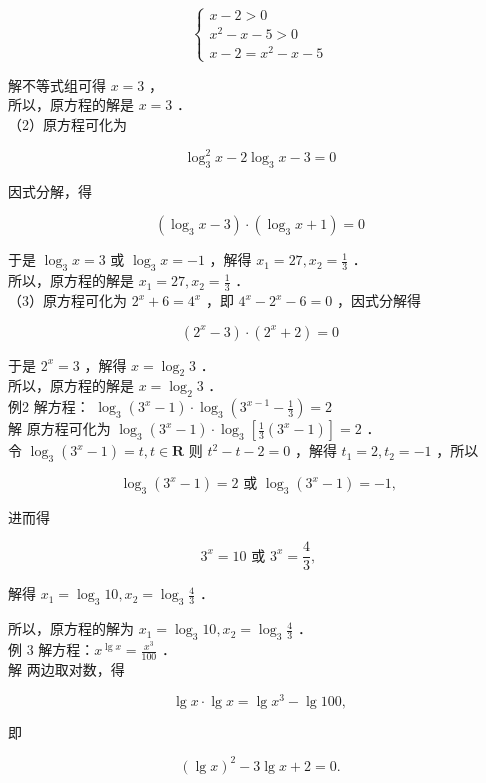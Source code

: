 \documentclass[10pt]{article}
\begin{document}
\[
\left\{\begin{array}{l}
x-2>0 \\
x^{2}-x-5>0 \\
x-2=x^{2}-x-5
\end{array}\right.
\]

解不等式组可得 \(x=3\) ，\\
所以，原方程的解是 \(x=3\) ．\\
（2）原方程可化为

\[
\log _{3}^{2} x-2 \log _{3} x-3=0
\]

因式分解，得

\[
\left(\log _{3} x-3\right) \cdot\left(\log _{3} x+1\right)=0
\]

于是 \(\log _{3} x=3\) 或 \(\log _{3} x=-1\) ，解得 \(x_{1}=27, x_{2}=\frac{1}{3}\) ．\\
所以，原方程的解是 \(x_{1}=27, x_{2}=\frac{1}{3}\) ．\\
（3）原方程可化为 \(2^{x}+6=4^{x}\) ，即 \(4^{x}-2^{x}-6=0\) ，因式分解得

\[
\left(2^{x}-3\right) \cdot\left(2^{x}+2\right)=0
\]

于是 \(2^{x}=3\) ，解得 \(x=\log _{2} 3\) ．\\
所以，原方程的解是 \(x=\log _{2} 3\) ．\\
例2 解方程： \(\log _{3}\left(3^{x}-1\right) \cdot \log _{3}\left(3^{x-1}-\frac{1}{3}\right)=2\)\\
解 原方程可化为 \(\log _{3}\left(3^{x}-1\right) \cdot \log _{3}\left[\frac{1}{3}\left(3^{x}-1\right)\right]=2\) ．\\
令 \(\log _{3}\left(3^{x}-1\right)=t, t \in \mathbf{R}\) 则 \(t^{2}-t-2=0\) ，解得 \(t_{1}=2, t_{2}=-1\) ，所以

\[
\log _{3}\left(3^{x}-1\right)=2 \text { 或 } \log _{3}\left(3^{x}-1\right)=-1 \text {, }
\]

进而得

\[
3^{x}=10 \text { 或 } 3^{x}=\frac{4}{3} \text {, }
\]

解得 \(x_{1}=\log _{3} 10, x_{2}=\log _{3} \frac{4}{3}\) ．

所以，原方程的解为 \(x_{1}=\log _{3} 10, x_{2}=\log _{3} \frac{4}{3}\) ．\\
例 3 解方程：\(x^{\lg x}=\frac{x^{3}}{100}\) ．\\
解 两边取对数，得

\[
\lg x \cdot \lg x=\lg x^{3}-\lg 100,
\]

即

\[
(\lg x)^{2}-3 \lg x+2=0 .
\]
\end{document}
